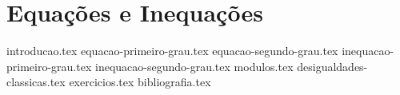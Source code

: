 \chapter{Equações e Inequações}
{
    \newcommand{\chapterdir}{../capitulos/equacoes-e-inequacoes/}
    
    {introducao.tex}
    {equacao-primeiro-grau.tex}
    {equacao-segundo-grau.tex}
    {inequacao-primeiro-grau.tex}
    {inequacao-segundo-grau.tex}
    {modulos.tex}
    {desigualdades-classicas.tex}
    {exercicios.tex}
    {bibliografia.tex} 
}

